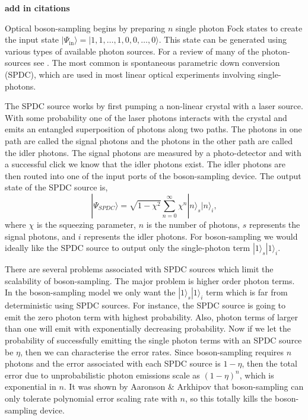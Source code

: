\documentclass[aps,pra,twocolumn,amsmath,amssymb,nofootinbib,superscriptaddress]{revtex4}
\newcommand{\ket}[1]{|#1\rangle}
\begin{document}
\textbf{add in citations}

Optical boson-sampling begins by preparing $n$ single photon Fock states to create the input state $\ket{\Psi_{\mathrm{in}}}=\ket{1,1,\dots,1,0,0,\dots,0}$. This state can be generated using various types of available photon sources. For a review of many of the photon-sources see \cite{bib:SourceAndDetectorReview}. The most common is spontaneous parametric down conversion (SPDC), which are used in most linear optical experiments involving single-photons. 

The SPDC source works by first pumping a non-linear crystal with a laser source. With some probability one of the laser photons interacts with the crystal and emits an entangled superposition of photons along two paths. The photons in one path are called the signal photons and the photons in the other path are called the idler photons. The signal photons are measured by a photo-detector and with a successful click we know that the idler photons exist. The idler photons are then routed into one of the input ports of the boson-sampling device. The output state of the SPDC source is,
\begin{equation} \label{SPDC}
\ket{\Psi_{SPDC}} = \sqrt{1-\chi^2}\sum_{n=0}^{\infty}\chi^n\ket{n}_s\ket{n}_i,
\end{equation}
where $\chi$ is the squeezing parameter, $n$ is the number of photons, $s$ represents the signal photons, and $i$ represents the idler photons. For boson-sampling we would ideally like the SPDC source to output only the single-photon term $\ket{1}_s\ket{1}_i$.  

There are several problems associated with SPDC sources which limit the scalability of boson-sampling. The major problem is higher order photon terms. In the boson-sampling model we only want the $\ket{1}_s\ket{1}_i$ term which is far from deterministic using SPDC sources. For instance, the SPDC source is going to emit the zero photon term with highest probability. Also, photon terms of larger than one will emit with exponentially decreasing probability. Now if we let the probability of successfully emitting the single photon terms with an SPDC source be $\eta$, then we can characterise the error rates. Since boson-sampling requires $n$ photons and the error associated with each SPDC source is $1-\eta$, then the total error due to unprobabilistic photon emissions scale as $(1-\eta)^{n}$, which is exponential in $n$. It was shown by Aaronson \& Arkhipov that boson-sampling can only tolerate polynomial error scaling rate with $n$, so this totally kills the boson-sampling device.
\end{document}
